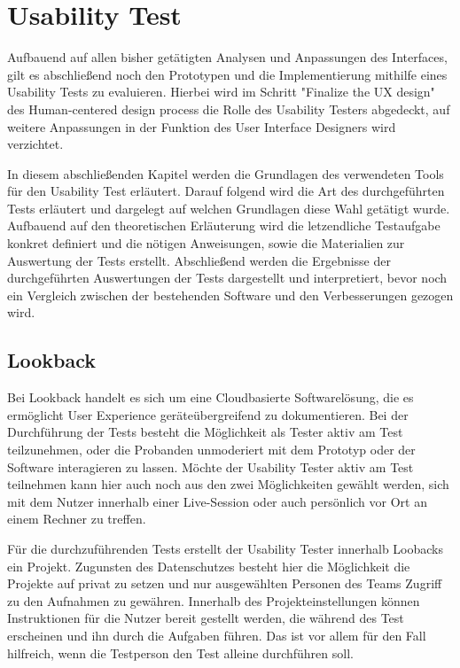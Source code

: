 \chapter{Usability Test}\label{ch:outlook}

Aufbauend auf allen bisher getätigten Analysen und Anpassungen des Interfaces, gilt es abschließend noch den Prototypen und die Implementierung mithilfe eines Usability Tests zu evaluieren.
Hierbei wird im Schritt "Finalize the UX design" des Human-centered design process die Rolle des Usability Testers abgedeckt, auf weitere Anpassungen in der Funktion des User Interface Designers wird verzichtet.

In diesem abschließenden Kapitel werden die Grundlagen des verwendeten Tools für den Usability Test erläutert.
Darauf folgend wird die Art des durchgeführten Tests erläutert und dargelegt auf welchen Grundlagen diese Wahl getätigt wurde.
Aufbauend auf den theoretischen Erläuterung wird die letzendliche Testaufgabe konkret definiert und die nötigen Anweisungen, sowie die Materialien zur Auswertung der Tests erstellt.
Abschließend werden die Ergebnisse der durchgeführten Auswertungen der Tests dargestellt und interpretiert, bevor noch ein Vergleich zwischen der bestehenden Software und den Verbesserungen gezogen wird.

\section{Lookback}

Bei Lookback handelt es sich um eine Cloudbasierte Softwarelösung, die es ermöglicht User Experience geräteübergreifend zu dokumentieren.
Bei der Durchführung der Tests besteht die Möglichkeit als Tester aktiv am Test teilzunehmen, oder die Probanden unmoderiert mit dem Prototyp oder der Software interagieren zu lassen.
Möchte der Usability Tester aktiv am Test teilnehmen kann hier auch noch aus den zwei Möglichkeiten gewählt werden, sich mit dem Nutzer innerhalb einer Live-Session oder  auch persönlich vor Ort an einem Rechner zu treffen.

Für die durchzuführenden Tests erstellt der Usability Tester innerhalb Loobacks ein Projekt.
Zugunsten des Datenschutzes besteht hier die Möglichkeit die Projekte auf privat zu setzen und nur ausgewählten Personen des Teams Zugriff zu den Aufnahmen zu gewähren.
Innerhalb des Projekteinstellungen können Instruktionen für die Nutzer bereit gestellt werden, die während des Test erscheinen und ihn durch die Aufgaben führen.
Das ist vor allem für den Fall hilfreich, wenn die Testperson den Test alleine durchführen soll.

